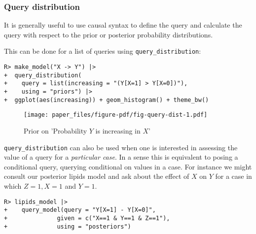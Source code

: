 \documentclass[
  11pt,
  article]{jss}
\begin{document}
\FloatBarrier

\hypertarget{query-distribution}{%
\subsubsection{Query distribution}\label{query-distribution}}

It is generally useful to use causal syntax to define the query and
calculate the query with respect to the prior or posterior probability
distributions.

This can be done for a list of queries using
\texttt{query\_distribution}:

\begin{verbatim}
R> make_model("X -> Y") |> 
+  query_distribution(
+    query = list(increasing = "(Y[X=1] > Y[X=0])"), 
+    using = "priors") |>
+  ggplot(aes(increasing)) + geom_histogram() + theme_bw()
\end{verbatim}

\begin{figure}[t]

{\centering \texttt{[image: paper\_files/figure-pdf/fig-query-dist-1.pdf]}

}

\caption{\label{fig-query-dist}Prior on 'Probability \(Y\) is increasing
in \(X\)'}

\end{figure}

\texttt{query\_distribution} can also be used when one is interested in
assessing the value of a query for a \emph{particular case}. In a sense
this is equivalent to posing a conditional query, querying conditional
on values in a case. For instance we might consult our posterior lipids
model and ask about the effect of \(X\) on \(Y\) for a case in which
\(Z=1, X=1\) and \(Y=1\).

\begin{verbatim}
R> lipids_model |>
+    query_model(query = "Y[X=1] - Y[X=0]",
+              given = c("X==1 & Y==1 & Z==1"),
+              using = "posteriors")
\end{verbatim}

\hypertarget{tbl-case-level-query}{}
\begin{table}[!h]
\caption{\label{tbl-case-level-query}Case Level Query Example. }\tabularnewline

\centering
{}
\end{table}
\end{document}
